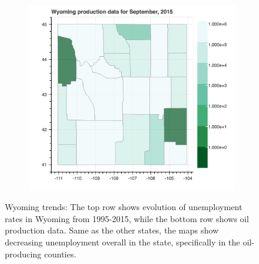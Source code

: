 \documentclass[11pt,letterpaper]{article}
\begin{document}
\begin{figure}[h!]
\begin{subfigure}{0.3\textwidth}
\includegraphics[width=1.2\linewidth]{wy_prod_2015}
\end{subfigure}
\caption{Wyoming trends: The top row shows evolution of unemployment rates in Wyoming from 1995-2015, while the bottom row shows oil production data. Same as the other states, the maps show decreasing unemployment overall in the state, specifically in the oil-producing counties.}
\label{fig:wy_maps}
\end{figure}
\end{document}
